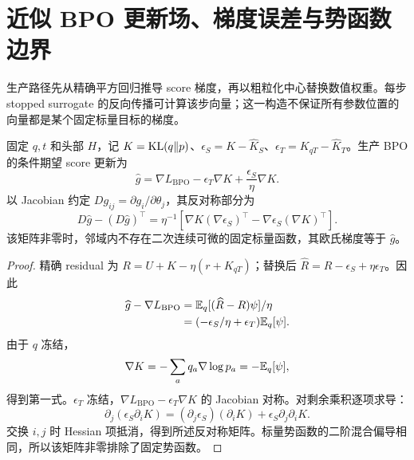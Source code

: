 \section{近似 BPO 更新场、梯度误差与势函数边界}
\label{opd:approximate-field}

生产路径先从精确平方回归推导 score 梯度，再以粗粒化中心替换数值权重。每步 stopped surrogate 的反向传播可计算该步向量；这一构造不保证所有参数位置的向量都是某个固定标量目标的梯度。

\begin{theorem}[粗粒化中心替换后的更新场]
\label{opd:field-curl}
固定 $q,t$ 和头部 $H$，记 $K=\operatorname{KL}(q\Vert p)$、$\epsilon_S=K-\widehat K_S$、$\epsilon_T=K_{qT}-\widehat K_T$。生产 BPO 的条件期望 score 更新为
\begin{equation}
\widehat g=\nabla L_{\mathrm{BPO}}-\epsilon_T\nabla K+\frac{\epsilon_S}{\eta}\nabla K.
\end{equation}
以 Jacobian 约定 $Dg_{ij}=\partial g_i/\partial\theta_j$，其反对称部分为
\begin{equation}
D\widehat g-(D\widehat g)^\top
=\eta^{-1}\left[\nabla K(\nabla\epsilon_S)^\top-\nabla\epsilon_S(\nabla K)^\top\right].
\end{equation}
该矩阵非零时，邻域内不存在二次连续可微的固定标量函数，其欧氏梯度等于 $\widehat g$。
\end{theorem}
\begin{proof}
精确 residual 为 $R=U+K-\eta(r+K_{qT})$；替换后 $\widehat R=R-\epsilon_S+\eta\epsilon_T$。因此
\begin{align}
\widehat g-\nabla L_{\mathrm{BPO}}
&=\mathbb E_q[(\widehat R-R)\psi]/\eta\\
&=(-\epsilon_S/\eta+\epsilon_T)\mathbb E_q[\psi].
\end{align}
由于 $q$ 冻结，
\begin{equation}
\nabla K=-\sum_aq_a\nabla\log p_a=-\mathbb E_q[\psi],
\end{equation}
得到第一式。$\epsilon_T$ 冻结，$\nabla L_{\mathrm{BPO}}-\epsilon_T\nabla K$ 的 Jacobian 对称。对剩余乘积逐项求导：
\begin{equation}
\partial_j(\epsilon_S\partial_iK)
=(\partial_j\epsilon_S)(\partial_iK)+\epsilon_S\partial_j\partial_iK.
\end{equation}
交换 $i,j$ 时 Hessian 项抵消，得到所述反对称矩阵。标量势函数的二阶混合偏导相同，所以该矩阵非零排除了固定势函数。
\end{proof}

